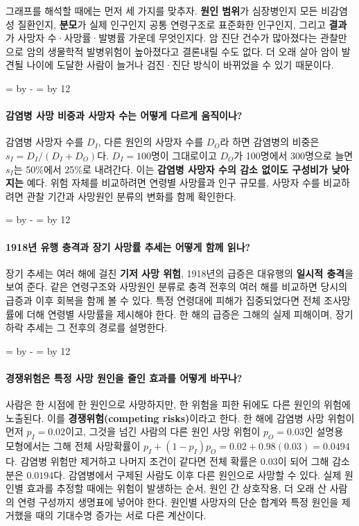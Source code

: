 \documentclass[10pt,a4paper]{article}
\newcommand{\ReserveQuestionSpace}{%
  \par\begingroup
  \dimen0=\pagegoal \advance\dimen0 by -\pagetotal
  \dimen2=\baselineskip \multiply\dimen2 by 12
  \ifdim\dimen0<\dimen2 \newpage\fi
  \endgroup}
\begin{document}
그래프를 해석할 때에는 먼저 세 가지를 맞추자. \textbf{원인 범위}가 심장병인지 모든 비감염성 질환인지, \textbf{분모}가 실제 인구인지 공통 연령구조로 표준화한 인구인지, 그리고 \textbf{결과}가 사망자 수·사망률·발병률 가운데 무엇인지다. 암 진단 건수가 많아졌다는 관찰만으로 암의 생물학적 발병위험이 높아졌다고 결론내릴 수도 없다. 더 오래 살아 암이 발견될 나이에 도달한 사람이 늘거나 검진·진단 방식이 바뀌었을 수 있기 때문이다.\par

\ReserveQuestionSpace
\paragraph{감염병 사망 비중과 사망자 수는 어떻게 다르게 움직이나?}
감염병 사망자 수를 $D_I$, 다른 원인의 사망자 수를 $D_O$라 하면 감염병의 비중은 $s_I=D_I/(D_I+D_O)$다. $D_I=100$명이 그대로이고 $D_O$가 100명에서 300명으로 늘면 $s_I$는 50\%에서 25\%로 내려간다. 이는 \textbf{감염병 사망자 수의 감소 없이도 구성비가 낮아지는} 예다. 위험 자체를 비교하려면 연령별 사망률과 인구 규모를, 사망자 수를 비교하려면 관찰 기간과 사망원인 분류의 변화를 함께 확인한다.\par

\ReserveQuestionSpace
\paragraph{1918년 유행 충격과 장기 사망률 추세는 어떻게 함께 읽나?}
장기 추세는 여러 해에 걸친 \textbf{기저 사망 위험}, 1918년의 급증은 대유행의 \textbf{일시적 충격}을 보여 준다. 같은 연령구조와 사망원인 분류로 충격 전후의 여러 해를 비교하면 당시의 급증과 이후 회복을 함께 볼 수 있다. 특정 연령대에 피해가 집중되었다면 전체 조사망률에 더해 연령별 사망률을 제시해야 한다. 한 해의 급증은 그해의 실제 피해이며, 장기 하락 추세는 그 전후의 경로를 설명한다.\par

\ReserveQuestionSpace
\paragraph{경쟁위험은 특정 사망 원인을 줄인 효과를 어떻게 바꾸나?}
사람은 한 시점에 한 원인으로 사망하지만, 한 위험을 피한 뒤에도 다른 원인의 위험에 노출된다. 이를 \textbf{경쟁위험(competing risks)}이라고 한다. 한 해에 감염병 사망 위험이 먼저 $p_I=0.02$이고, 그것을 넘긴 사람의 다른 원인 사망 위험이 $p_O=0.03$인 설명용 모형에서는 그해 전체 사망확률이 $p_I+(1-p_I)p_O=0.02+0.98(0.03)=0.0494$다. 감염병 위험만 제거하고 나머지 조건이 같다면 전체 확률은 $0.03$이 되어 그해 감소분은 $0.0194$다. 감염병에서 구제된 사람도 이후 다른 원인으로 사망할 수 있다. 실제 원인별 효과를 추정할 때에는 위험이 발생하는 순서, 원인 간 상호작용, 더 오래 산 사람의 연령 구성까지 생명표에 넣어야 한다. 원인별 사망자의 단순 합계와 특정 원인을 제거했을 때의 기대수명 증가는 서로 다른 계산이다.\par
\end{document}
